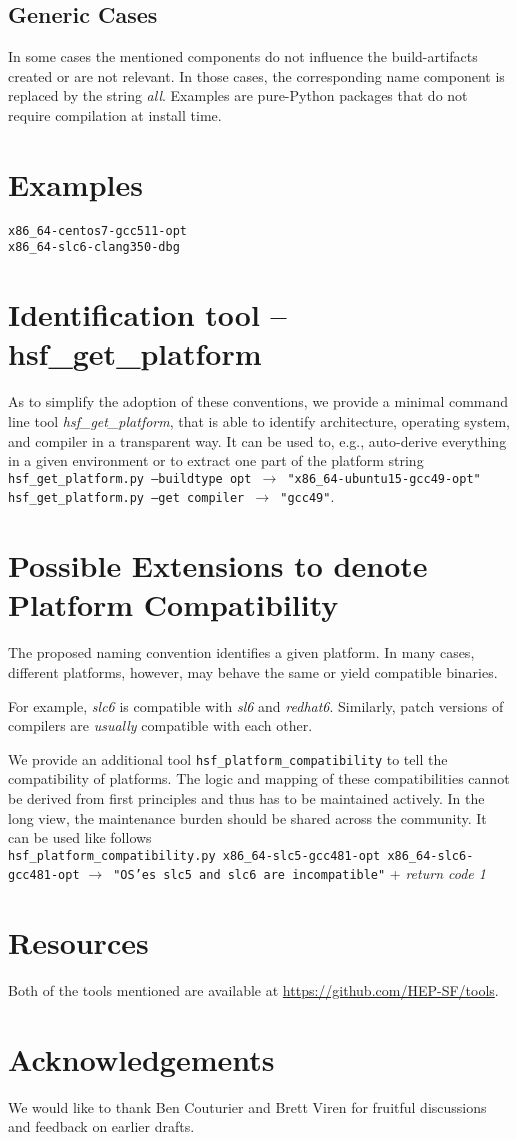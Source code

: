 \documentclass[12pt,a4paper]{article}
\begin{document}
\subsection{Generic Cases}
In some cases the mentioned components do not influence the build-artifacts created or are not relevant. In those cases, the corresponding name component is replaced by the string \emph{all}. Examples are pure-Python packages that do not require compilation at install time.


\section{Examples}
\texttt{x86\_64-centos7-gcc511-opt}
\\
\texttt{x86\_64-slc6-clang350-dbg}


\section{Identification tool -- hsf\_get\_platform}
As to simplify the adoption of these conventions, we provide a minimal command line tool \emph{hsf\_get\_platform}, that is able to identify architecture, operating system, and compiler in a transparent way. It can be used to, e.g., auto-derive everything in a given environment or to extract one part of the platform string
\\
\texttt{hsf\_get\_platform.py --buildtype opt $\rightarrow$ "x86\_64-ubuntu15-gcc49-opt"}
\\
\texttt{hsf\_get\_platform.py --get compiler $\rightarrow$ "gcc49"}.

\section{Possible Extensions to denote Platform Compatibility}
The proposed naming convention identifies a given platform. In many cases, different platforms, however, may behave the same or yield compatible binaries.

For example, \emph{slc6} is compatible with \emph{sl6} and \emph{redhat6}. Similarly, patch versions of compilers are \emph{usually} compatible with each other.

We provide an additional tool \texttt{hsf\_platform\_compatibility} to tell the compatibility of platforms. The logic and mapping of these compatibilities cannot be derived from first principles and thus has to be maintained actively. In the long view, the maintenance burden should be shared across the community. It can be used like follows
\\
\newline
\texttt{hsf\_platform\_compatibility.py x86\_64-slc5-gcc481-opt x86\_64-slc6-gcc481-opt}
\newline
\texttt{$\rightarrow$ "OS'es slc5 and slc6 are incompatible"} + \emph{return code 1}

\section{Resources}
Both of the tools mentioned are available at \url{https://github.com/HEP-SF/tools}.

\section*{Acknowledgements}
We would like to thank Ben Couturier and Brett Viren for fruitful discussions and feedback on earlier drafts.
\end{document}
